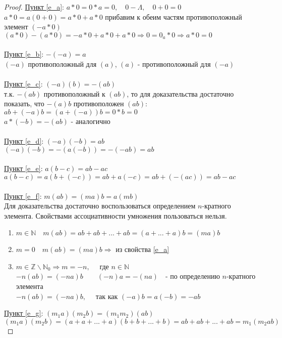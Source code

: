 \documentclass[12pt,oneside]{article}
\theoremstyle{definition}
\newcommand{\ZZ}{\mathbb{Z}}
\newcommand{\NN}{\mathbb{N}}
\begin{document}
\begin{proof}
	\underline{Пункт \ref{e_a}}: $a*0=0*a=0, \quad 0-\Lambda, \quad 0+0=0$\\
	$a*0=a(0+0)=a*0+a*0$ прибавим к обеим частям противоположный элемент $(-a*0)$\\
	$(a*0)-(a*0)=-a*0+a*0+a*0 \Rightarrow 0=0_a*0\Rightarrow a*0=0$\\\\
	
	\underline{Пункт \ref{e_b}}: $-(-a)=a$\\
	$(-a)$ противоположный для $(a)$, $(a)$ - противоположный для $(-a)$\\\\
	
	\underline{Пункт \ref{e_c}}: $(-a)(b)=-(ab)$\\
	т.к. $-(ab)$ противоположный к $(ab)$, то для доказательства достаточно показать, что $-(a)b$ противоположен $(ab)$:\\
	$ab+(-a)b=(a+(-a))b=0*b=0$\\
	$a*(-b)=-(ab)$ - аналогично\\\\
	
	\underline{Пункт \ref{e_d}}: $(-a)(-b)=ab$\\
	$(-a)(-b)=-(a(-b))=-(-ab)=ab$\\\\
	
	\underline{Пункт \ref{e_e}}: $a(b-c)=ab-ac$\\
	$a(b-c)=a(b+(-c))=ab+a(-c)=ab+(-(ac))=ab-ac$\\\\
	
	\underline{Пункт \ref{e_f}}: $m(ab)=(ma)b=a(mb)$\\
	Для доказательства достаточно воспользоваться определением $n$-кратного элемента. Свойствами ассоциативности умножения пользоваться нельзя.\\
	\begin{enumerate}
		\item $m\in \NN \quad m(ab)=ab+ab+...+ab=(a+...+a)b=(ma)b$
		\item $m=0 \quad m(ab)=(ma)b\Rightarrow$ из свойства \ref{e_a}
		\item $m\in\ZZ \backslash \NN_0 \Rightarrow m=-n, \quad$ где $n\in \NN$\\
			$-n(ab)=(-na)b \qquad (-n)a=-(na) \quad$- по определению $n$-кратного элемента\\
			$-n(ab)=(-na)b, \quad$ так как $(-a)b=a(-b)=-ab$ 
	\end{enumerate}

	\underline{Пункт \ref{e_g}}: $(m_1a)(m_2b)=(m_1m_2)(ab)$\\
	$(m_1a)(m_2b)=(a+a+...+a)(b+b+...+b)=ab+ab+...+ab=m_1(m_2ab)$
	
\end{proof}
\end{document}
